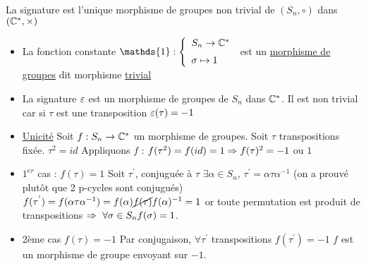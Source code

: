 \documentclass[11pt]{article}
\begin{document}
\begin{corr}{}{}
    La signature est l'unique morphisme de groupes non trivial de $(S_{n}, \circ)$ dans $(\mathbb{C}^{*}, \times)$
    \tcblower
    \begin{itemize}
        \item La fonction constante \n
        $\mathds{1} : \left\{ \begin{array}{ll}
             S_{n} \to \C^{*}  \n
             \s \mapsto 1
        \end{array}\right.$ est un \underline{morphisme de groupes} dit morphisme \underline{trivial}
        \item La signature $\varepsilon$ est un morphisme de groupes de $S_{n}$ dans $\mathbb{C}^{*}$. Il est non trivial car si $\tau$ est une transposition $\varepsilon(\tau) = -1$
        \item \underline{Unicité} Soit $f : S_{n} \to \mathbb{C}^{*}$ un morphisme de groupes.\n
        Soit $\tau$ transpositions fixée. $\tau^{2} = id$\n
        Appliquons $f$ :\n
        $f(\tau^{2}) = f(id) = 1 \Rightarrow f(\tau)^{2} = -1$ ou $1$
        \item $1^{er}$ cas : $f(\tau) = 1$\n
        Soit $\tau^{'}$, conjuguée à $\tau$\n 
        $\exists \alpha \in S_{n}$, $\tau^{'} = \alpha \tau \alpha^{-1}$ (on a prouvé plutôt que 2 p-cycles sont conjugués)\n
        $f(\tau^{'}) = f(\alpha \tau \alpha^{-1}) = f(\alpha) \cancel{f(\tau)} f(\alpha)^{-1} = 1$\n
        or toute permutation est produit de transpositions $\Rightarrow ~ \forall \sigma \in S_{n} f(\sigma) = 1$.
        \item 2ème cas $f(\tau) = -1$\n
        Par conjugaison, $\forall \tau^{'}$ transpositions $f(\tau^{'}) = -1$\n
        $f$ est un morphisme de groupe envoyant sur $-1$.
    \end{itemize}
\end{corr}
\end{document}
